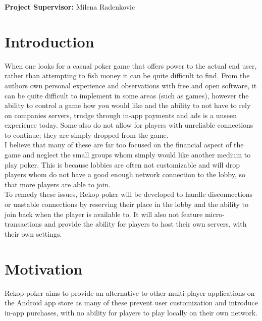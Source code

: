\documentclass[11pt]{article}
\begin{document}
\vfill

\begin{center}
	\textbf{Project Supervisor:} Milena Radenkovic
\end{center}

\hspace{0pt}

\pagebreak


\newcommand{\entry}[1]{
	\textbf{#1} - 
}

\newcommand{\TODO}[1]{
	\textbf{{\Large \emph{#1}}}
}



\tableofcontents



\newpage



\section{Introduction}

When one looks for a casual poker game that offers power to the actual end user, rather than attempting to fish money it can be quite difficult to find. From the authors own personal experience and observations with free and open software, it can be quite difficult to implement in some areas (such as games), however the ability to control a game how you would like and the ability to not have to rely on companies servers, trudge through in-app payments and ads is a unseen experience today. Some also do not allow for players with unreliable connections to continue; they are simply dropped from the game.  \\

I believe that many of these are far too focused on the financial aspect of the game and neglect the small groups whom simply would like another medium to play poker. This is because lobbies are often not customizable and will drop players whom do not have a good enough network connection to the lobby, so that more players are able to join.  \\

To remedy these issues, Rekop poker will be developed to handle disconnections or unstable connections by reserving their place in the lobby and the ability to join back when the player is available to. It will also not feature micro-transactions and provide the ability for players to host their own servers, with their own settings.



\section{Motivation}
Rekop poker aims to provide an alternative to other multi-player applications on the Android app store as many of these prevent user customization and introduce in-app purchases, with no ability for players to play locally on their own network. 
\end{document}
